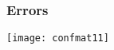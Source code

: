 \begin{frame}[fragile]\frametitle{Errors}
\begin{center}
\texttt{[image: confmat11]}
\end{center}
\end{frame}






